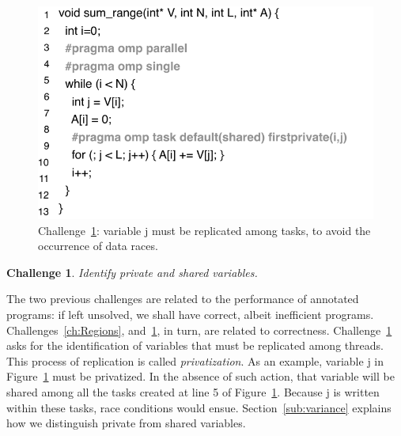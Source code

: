\documentclass[sigplan,10pt,review,anonymous]{acmart}
\newtheorem{Challenge}{Challenge}[section]
\begin{document}
\begin{figure}[h!]
\begin{center}
\includegraphics[width=1\columnwidth]{images/ex_privatize}
\caption{Challenge~\ref{ch:privatize}: variable \textsf{j} must be replicated among
tasks, to avoid the occurrence of data races.}
\label{fig:ex_privatize}
\end{center}
\end{figure}

\begin{Challenge}
\label{ch:privatize}
Identify private and shared variables.
\end{Challenge}

The two previous challenges are related to the performance of annotated
programs: if left unsolved, we shall have correct, albeit inefficient programs.
Challenges~\ref{ch:Regions}, and~\ref{ch:privatize}, in turn, are
related to correctness.
Challenge~\ref{ch:privatize} asks for the identification of variables that
must be replicated among threads.
This process of replication is called {\em privatization}.
As an example, variable \textsf{j} in Figure~\ref{fig:ex_privatize} must
be privatized.
In the absence of such action, that variable will be shared among all the
tasks created at line 5 of Figure~\ref{fig:ex_privatize}.
Because \textsf{j} is written within these tasks, race conditions would
ensue.
Section~\ref{sub:variance} explains how we distinguish private from
shared variables.


\end{document}
